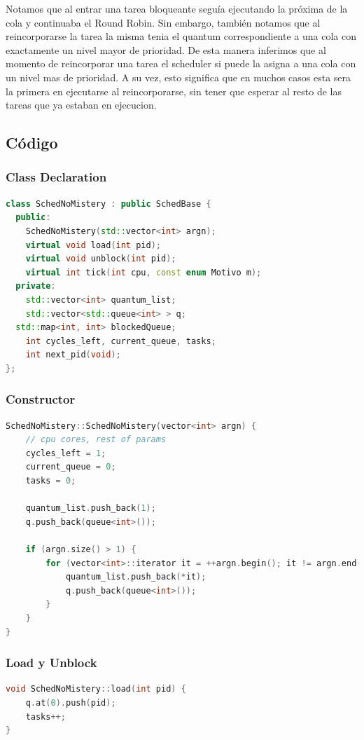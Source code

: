 Notamos que al entrar una tarea bloqueante seguía ejecutando la próxima de la cola y continuaba el Round Robin. Sin embargo, también notamos que al reincorporarse la tarea la misma tenia el quantum correspondiente a una cola con exactamente un nivel mayor de prioridad. De esta manera inferimos que al momento de reincorporar una tarea el scheduler si puede la asigna a una cola con un nivel mas de prioridad. A su vez, esto significa que en muchos casos esta sera la primera en ejecutarse al reincorporarse, sin tener que esperar al resto de las tareas que ya estaban en ejecucion.

\pagebreak

\subsection{Código}

\subsubsection{Class Declaration}
\begin{lstlisting}[language=C++, breaklines=true]
class SchedNoMistery : public SchedBase {
  public:
    SchedNoMistery(std::vector<int> argn);
    virtual void load(int pid);
    virtual void unblock(int pid);
    virtual int tick(int cpu, const enum Motivo m);
  private:
	std::vector<int> quantum_list;
	std::vector<std::queue<int> > q;
  std::map<int, int> blockedQueue;
	int cycles_left, current_queue, tasks;
	int next_pid(void);
};
\end{lstlisting}


\subsubsection{Constructor}
\begin{lstlisting}[language=C++, breaklines=true]
SchedNoMistery::SchedNoMistery(vector<int> argn) {
	// cpu cores, rest of params
	cycles_left = 1;
	current_queue = 0;
	tasks = 0;

	quantum_list.push_back(1);
	q.push_back(queue<int>());

	if (argn.size() > 1) {
		for (vector<int>::iterator it = ++argn.begin(); it != argn.end(); ++it) {
			quantum_list.push_back(*it);
			q.push_back(queue<int>());
		}
	}
}
\end{lstlisting}


\subsubsection{Load y Unblock}
\begin{lstlisting}[language=C++, breaklines=true]
void SchedNoMistery::load(int pid) {
	q.at(0).push(pid);
	tasks++;
}
\end{lstlisting}

